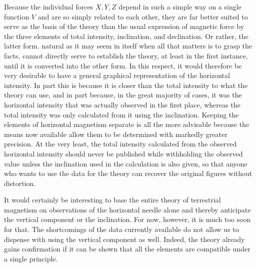Because the individual forces $X,Y,Z$ depend in such a simple way on a single function $V$ and are so simply related to each other, they are far better suited to serve as the basis of the theory than the usual expression of magnetic force by the three elements of total intensity, inclination, and declination. Or rather, the latter form. natural as it may seem in itself when all that matters is to grasp the facts, cannot directly serve to establish the theory, at least in the first instance, until it is converted into the other form. In this respect, it would therefore be very desirable to have a general graphical representation of the horizontal intensity. In part this is because it is closer than the total intensity to what the theory can use, and in part because, in the great majority of cases, it was the horizontal intensity that was actually observed in the first place, whereas the total intensity was only calculated from it using the inclination. Keeping the elements of horizontal magnetism separate is all the more advisable because the means now available allow them to be determined with markedly greater precision. At the very least, the total intensity calculated from the observed horizontal intensity should never be published while withholding the observed value unless the inclination used in the calculation is also given, so that anyone who wants to use the data for the theory can recover the original figures without distortion.

It would certainly be interesting to base the entire theory of terrestrial magnetism on observations of the horizontal needle alone and thereby anticipate the vertical component or the inclination. For now, however, it is much too soon for that. The shortcomings of the data currently available do not allow us to dispense with using the vertical component as well. Indeed, the theory already gains confirmation if it can be shown that all the elements are compatible under a single principle.


